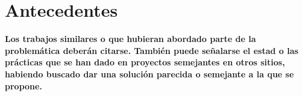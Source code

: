 \section{Antecedentes}\label{sc:Antec}

\textbf{Los trabajos similares o que hubieran abordado parte de la problemática deberán citarse. También puede señalarse el estad o las prácticas que se han dado en proyectos semejantes en otros sitios, habiendo buscado dar una solución parecida o semejante a la que se propone.}
